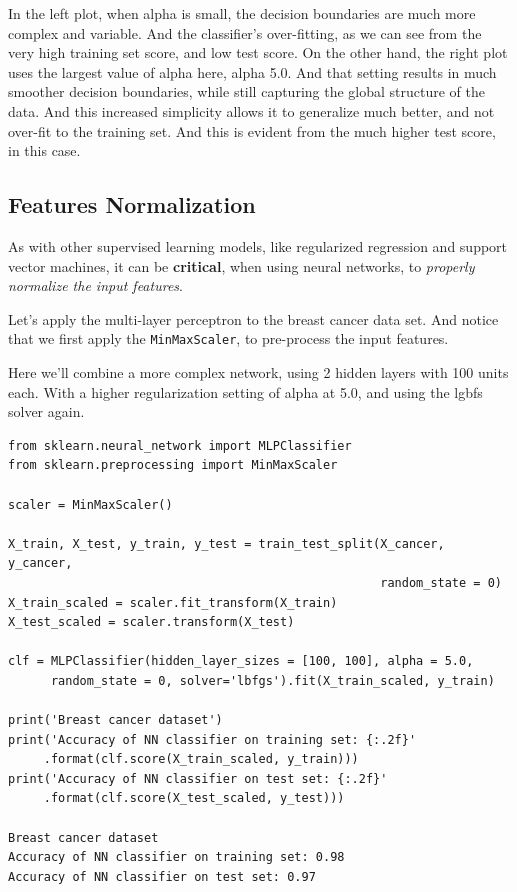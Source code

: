 \begin{multicols}{2}
In the left plot, when alpha is small, the decision boundaries are much more complex and variable. And the classifier's over-fitting, as we can see from the very high training set score, and low test score. On the other hand, the right plot uses the largest value of alpha here, alpha 5.0. And that setting results in much smoother decision boundaries, while still capturing the global structure of the data. And this increased simplicity allows it to generalize much better, and not over-fit to the training set. And this is evident from the much higher test score, in this case. 

\subsection{Features Normalization}

As with other supervised learning models, like regularized regression and support vector machines, it can be \textbf{critical}, when using neural networks, to \emph{properly normalize the input features}. 

Let's apply the multi-layer perceptron to the breast cancer data set. And notice that we first apply the \texttt{MinMaxScaler}, to pre-process the input features. 

Here we'll combine a more complex network, using 2 hidden layers with 100 units each. With a higher regularization setting of alpha at 5.0, and using the lgbfs solver again. 

{\tiny
\begin{verbatim}
from sklearn.neural_network import MLPClassifier
from sklearn.preprocessing import MinMaxScaler

scaler = MinMaxScaler()

X_train, X_test, y_train, y_test = train_test_split(X_cancer, y_cancer,
                                                    random_state = 0)
X_train_scaled = scaler.fit_transform(X_train)
X_test_scaled = scaler.transform(X_test)

clf = MLPClassifier(hidden_layer_sizes = [100, 100], alpha = 5.0,
      random_state = 0, solver='lbfgs').fit(X_train_scaled, y_train)

print('Breast cancer dataset')
print('Accuracy of NN classifier on training set: {:.2f}'
     .format(clf.score(X_train_scaled, y_train)))
print('Accuracy of NN classifier on test set: {:.2f}'
     .format(clf.score(X_test_scaled, y_test)))
     
Breast cancer dataset
Accuracy of NN classifier on training set: 0.98
Accuracy of NN classifier on test set: 0.97 
\end{verbatim}
}


\end{multicols}
